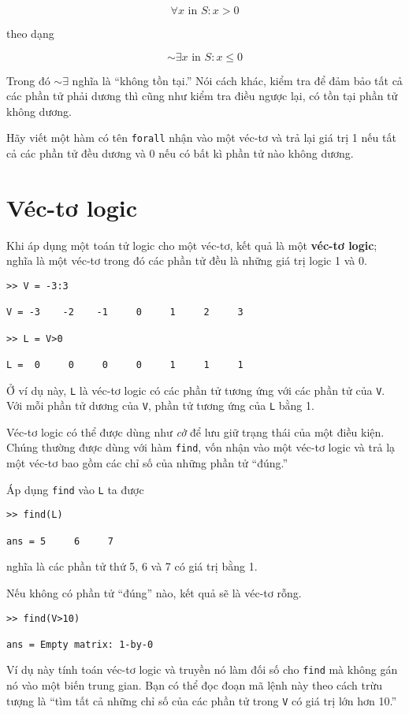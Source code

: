 \documentclass[12pt]{book}
\begin{document}
\[ \forall x \mbox{~in~} S: x>0 \]

\noindent theo dạng

\[ \sim \exists x \mbox{~in~} S: x \le 0 \]

Trong đó $\sim \exists$ nghĩa là ``không tồn tại.'' Nói cách khác,
kiểm tra để đảm bảo tất cả các phần tử phải dương thì cũng như
kiểm tra điều ngược lại, có tồn tại phần tử không dương.

\begin{ex}
Hãy viết một hàm có tên {\tt forall} nhận vào một véc-tơ và trả lại
giá trị 1 nếu tất cả các phần tử đều dương và 0 nếu có bất kì phần
tử nào không dương.
\end{ex}




\section{Véc-tơ logic}

Khi áp dụng một toán tử logic cho một véc-tơ, kết quả là một
{\bf véc-tơ logic}; nghĩa là một véc-tơ trong đó các phần tử
đều là những giá trị logic 1 và 0.

\begin{verbatim}
>> V = -3:3

V = -3    -2    -1     0     1     2     3

>> L = V>0

L =  0     0     0     0     1     1     1
\end{verbatim}
%
Ở ví dụ này, {\tt L} là véc-tơ logic có các phần tử tương ứng với
các phần tử của {\tt V}. Với mỗi phần tử dương của
{\tt V}, phần tử tương ứng của {\tt L} bằng 1.

Véc-tơ logic có thể được dùng như \emph{cờ} để lưu giữ trạng thái
của một điều kiện. Chúng thường được dùng với hàm {\tt find},
vốn nhận vào một véc-tơ logic và trả lạ một véc-tơ bao gồm các
chỉ số của những phần tử ``đúng.''

Áp dụng {\tt find} vào {\tt L} ta được

\begin{verbatim}
>> find(L)

ans = 5     6     7
\end{verbatim}
%
\noindent nghĩa là các phần tử thứ 5, 6 và 7  có giá trị bằng 1.

Nếu không có phần tử ``đúng'' nào, kết quả sẽ là véc-tơ rỗng.

\begin{verbatim}
>> find(V>10)

ans = Empty matrix: 1-by-0
\end{verbatim}
%
Ví dụ này tính toán véc-tơ logic và truyền nó làm đối số cho
{\tt find} mà không gán nó vào một biến trung gian. Bạn có thể
đọc đoạn mã lệnh này theo cách trừu tượng là ``tìm tất cả
những chỉ số của các phần tử trong {\tt V} có giá trị lớn hơn 10.''
\end{document}
